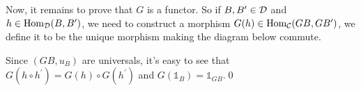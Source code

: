 \begin{itemize}
    Now, it remains to prove that $G$ is a functor. So if $B,B^\prime\in\mathcal{D}$ and $h\in\text{Hom}_{\mathcal{D}}(B,B^\prime)$, 
    we need to construct a morphism $G(h)\in\text{Hom}_{\mathcal{C}}(GB,GB^\prime)$, we define it to be the unique morphism making 
    the diagram below commute. 
    \begin{center}\label{diagram: property of FGB}
    \end{center}
    Since $(GB, u_B)$ are universals, it's easy to see that $G(h\circ h^\prime)=G(h)\circ G(h^\prime)$ and 
    $G(\mathds{1}_B)=\mathds{1}_{GB}$.\qed
    

\end{itemize}
